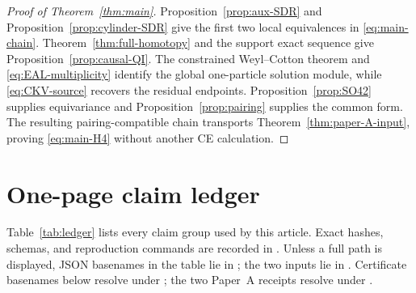 \documentclass[11pt]{article}
\theoremstyle{definition}
\theoremstyle{remark}
\begin{document}
\begin{proof}[Proof of Theorem~\ref{thm:main}]
Proposition~\ref{prop:aux-SDR} and
Proposition~\ref{prop:cylinder-SDR} give the first two local equivalences in
\eqref{eq:main-chain}.  Theorem~\ref{thm:full-homotopy} and the support exact
sequence give Proposition~\ref{prop:causal-QI}.  The constrained
Weyl--Cotton theorem and \eqref{eq:EAL-multiplicity} identify the global
one-particle solution module, while \eqref{eq:CKV-source} recovers the
residual endpoints.  Proposition~\ref{prop:SO42} supplies equivariance and
Proposition~\ref{prop:pairing} supplies the common form.  The resulting
pairing-compatible chain transports Theorem~\ref{thm:paper-A-input}, proving
\eqref{eq:main-H4} without another CE calculation.
\end{proof}

\clearpage
\section{One-page claim ledger}\label{sec:ledger}

Table~\ref{tab:ledger} lists every claim group used by this article.  Exact
hashes, schemas, and reproduction commands are recorded in
.
Unless a full path is displayed, JSON basenames in the table lie in
; the two
 inputs lie in
.
Certificate basenames below resolve under
; the two Paper~A receipts resolve
under .
\end{document}
